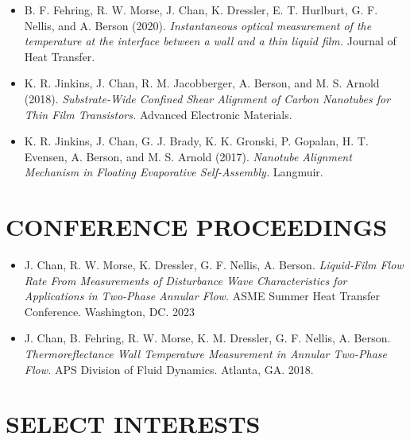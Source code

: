 \documentclass[letterpaper,11pt]{article}
\begin{document}
\begin{itemize}
    \item \small B. F. Fehring, R. W. Morse, J. Chan, K. Dressler, E. T. Hurlburt, G. F. Nellis, and A. Berson (2020). \textit{Instantaneous optical measurement of the temperature at the interface between a wall and a thin liquid film.} Journal of Heat Transfer.
    
    \item \small K. R. Jinkins, J. Chan, R. M. Jacobberger, A. Berson, and M. S. Arnold (2018). \textit{Substrate-Wide Confined Shear Alignment of Carbon Nanotubes for Thin Film Transistors.} Advanced Electronic Materials.
    
    \item \small K. R. Jinkins, J. Chan, G. J. Brady, K. K. Gronski, P. Gopalan, H. T. Evensen, A. Berson, and M. S. Arnold (2017). \textit{Nanotube Alignment Mechanism in Floating Evaporative Self-Assembly.} Langmuir.

\end{itemize}
\section{CONFERENCE PROCEEDINGS}
\begin{itemize}
\itemsep0em 
  \item \small  J. Chan, R. W. Morse, K. Dressler, G. F. Nellis, A. Berson.  \textit{Liquid-Film Flow Rate From Measurements of Disturbance Wave Characteristics for Applications in Two-Phase Annular Flow.} ASME Summer Heat Transfer Conference. Washington, DC. 2023

  \item \small J. Chan, B. Fehring, R. W. Morse, K. M. Dressler, G. F. Nellis, A. Berson. \textit{Thermoreflectance Wall Temperature Measurement in Annular Two-Phase Flow.} APS Division of Fluid Dynamics. Atlanta, GA. 2018.
  
\end{itemize}





%
\section{SELECT INTERESTS}
 \begin{itemize}[leftmargin=0.15in, label={}]\vspace{0pt}
    
 \end{itemize}
\end{document}
